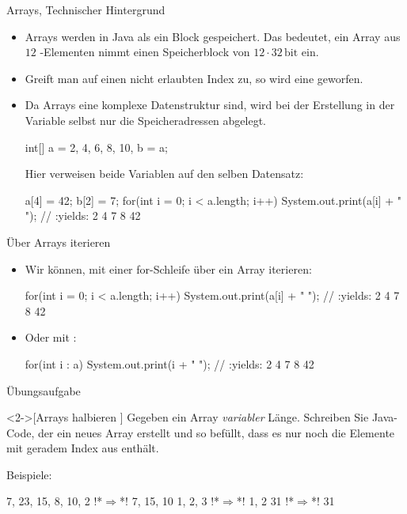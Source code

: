 \begin{frame}[fragile]{Arrays, Technischer Hintergrund}
    \begin{itemize}[<+(1)->]
        \widei
        \item Arrays werden in Java als ein Block gespeichert.\pause{} Das bedeutet, ein Array aus \(12\) -Elementen nimmt einen Speicherblock von \(12 \cdot 32\,\text{bit}\) ein.
        \item Greift man auf einen nicht erlaubten Index zu,\pause{} so wird eine  geworfen.
        \item Da Arrays eine komplexe Datenstruktur sind, wird bei der Erstellung in der Variable selbst nur die Speicheradressen abgelegt.\pause{}
\begin{plainjava}
int[] a = {2, 4, 6, 8, 10}, b = a;
\end{plainjava}
        \pause{}Hier verweisen beide Variablen auf den selben Datensatz:\pause{}
\begin{plainjava}
a[4] = 42; b[2] = 7;
for(int i = 0; i < a.length; i++)
    System.out.print(a[i] + " "); // :yields: 2 4 7 8 42
\end{plainjava}
    \end{itemize}
\end{frame}

\begin{frame}[fragile]{Über Arrays iterieren}
    \begin{itemize}[<+(1)->]
        \widei
        \item Wir können,\pause{} mit einer for-Schleife über ein Array iterieren:\pause{}
\begin{plainjava}
for(int i = 0; i < a.length; i++) {
    System.out.print(a[i] + " "); // :yields: 2 4 7 8 42
}
\end{plainjava}
        \item Oder mit :\pause{}
\begin{plainjava}
for(int i : a) {
    System.out.print(i + " "); // :yields: 2 4 7 8 42
}
\end{plainjava}
    \end{itemize}
\end{frame}


\ifull
\begin{frame}[c,fragile]{Übungsaufgabe}
\begin{exercise}<2->[Arrays halbieren ]
    Gegeben ein Array  \emph{variabler} Länge. Schreiben Sie Java-Code, der ein neues Array  erstellt und so befüllt, dass es nur noch die Elemente mit geradem Index aus  enthält.\par\pause{}
    Beispiele:\pause
\begin{plainjava}
{7, 23, 15, 8, 10, 2} !*$\Rightarrow$*! {7, 15, 10}
{1, 2, 3} !*$\Rightarrow$*! {1, 2}
{31} !*$\Rightarrow$*! {31}
\end{plainjava}
\end{exercise}
\end{frame}

